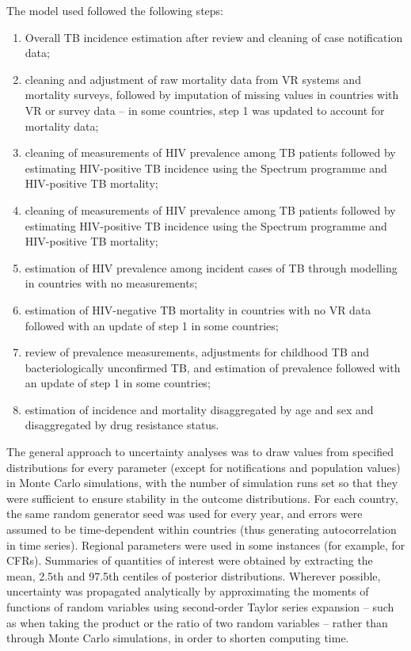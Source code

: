 The model used followed the following steps: 

\begin{enumerate}
\item Overall TB incidence estimation after review and cleaning of case notification data;
\item cleaning and adjustment of raw mortality data from VR systems and mortality surveys, followed by imputation of missing values in countries with VR or survey data – in some countries, step 1 was updated to account for mortality data;
\item cleaning of measurements of HIV prevalence among TB patients followed by estimating HIV-positive TB incidence using the Spectrum programme and HIV-positive TB mortality;
\item cleaning of measurements of HIV prevalence among TB patients followed by estimating HIV-positive TB incidence using the Spectrum programme and HIV-positive TB mortality;
\item estimation of HIV prevalence among incident cases of TB through modelling in countries with no measurements;
\item estimation of HIV-negative TB mortality in countries with no VR data followed with an update of step 1 in some countries; 
\item review of prevalence measurements, adjustments for childhood TB and bacteriologically unconfirmed TB,  and estimation of prevalence followed with an update of step 1 in some countries; 
\item estimation of incidence and mortality disaggregated by age and sex and disaggregated by drug resistance status.
\end{enumerate}

The general approach to uncertainty analyses was to draw values from specified distributions for every parameter (except for notifications and population values) in Monte Carlo simulations, with the number of simulation runs set so that they were sufficient to ensure stability in the outcome distributions. For each country, the same random generator seed was used for every year, and errors were assumed to be time-dependent within countries (thus generating autocorrelation in time series). Regional parameters were used in some instances (for example, for CFRs). Summaries of quantities of interest were obtained by extracting the mean, 2.5th and 97.5th centiles of posterior distributions. Wherever possible, uncertainty was propagated analytically by approximating the moments of functions of random variables using second-order Taylor series expansion\cite{Ku_1966} – such as when taking the product or the ratio of two random variables – rather than through Monte Carlo simulations, in order to shorten computing time. 

